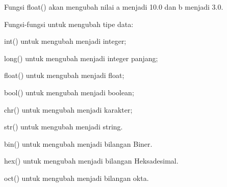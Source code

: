 \noindent 
Fungsi $  $float() $  $akan mengubah nilai $  $a $  $menjadi $  $10.0 $  $dan $  $b $  $menjadi $  $3.0. \par
\vspace{12pt}
\noindent 
Fungsi-fungsi untuk mengubah tipe data: \par
\vspace{12pt}
\noindent 
int() $  $untuk mengubah menjadi integer; \par
\vspace{12pt}
\noindent 
long() $  $untuk mengubah menjadi integer panjang; \par
\vspace{12pt}
\noindent 
float() $  $untuk mengubah menjadi float; \par
\vspace{12pt}
\noindent 
bool() $  $untuk mengubah menjadi boolean; \par
\vspace{12pt}
\noindent 
chr() $  $untuk mengubah menjadi karakter; \par
\vspace{12pt}
\noindent 
str() $  $untuk mengubah menjadi string. \par
\vspace{12pt}
\noindent 
bin() $  $untuk mengubah menjadi bilangan Biner. \par
\vspace{12pt}
\noindent 
hex() $  $untuk mengubah menjadi bilangan Heksadesimal. \par
\vspace{12pt}
\noindent 
oct() $  $untuk mengubah menjadi bilangan okta. \par
\vspace{12pt}
\vspace{12pt}

